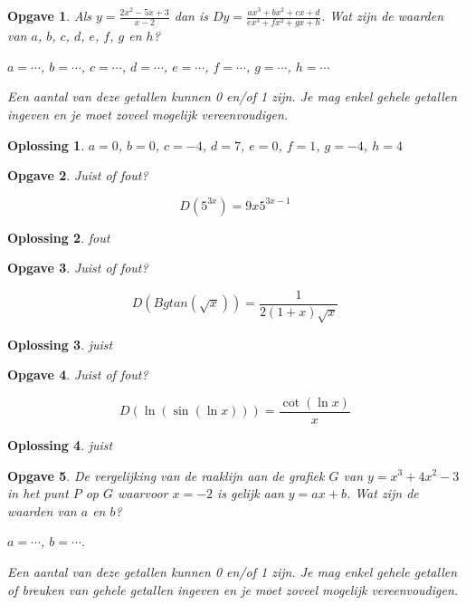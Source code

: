 \documentclass{article}
\newtheorem{opgave}{Opgave}
\newtheorem*{oplossing}{Oplossing}
\begin{document}
\begin{opgave}
Als $y=\frac{2x^2-5x+3}{x-2}$ dan is $Dy=\frac{ax^3+bx^2+cx+d}{ex^3+fx^2+gx+h}$. Wat zijn de waarden van $a$, $b$, $c$, $d$, $e$, $f$, $g$ en $h$?\vspace{2mm}

\noindent $a= \cdots$, $b=\cdots$, $c=\cdots$, $d=\cdots$, $e=\cdots$, $f=\cdots$, $g=\cdots$, $h=\cdots$ \vspace{1mm}

\noindent Een aantal van deze getallen kunnen 0 en/of 1 zijn. Je mag enkel gehele getallen ingeven en je moet zoveel mogelijk vereenvoudigen.
\end{opgave}

\begin{oplossing}
$a=0$, $b=0$, $c=-4$, $d=7$, $e=0$, $f=1$, $g=-4$, $h=4$
\end{oplossing}

\begin{opgave}
Juist of fout?

\[
D(5^{3x})=9x5^{3x-1}
\]
\end{opgave}

\begin{oplossing}
fout
\end{oplossing}

\begin{opgave}
Juist of fout?

\[
D(Bgtan(\sqrt{x}))=\frac{1}{2(1+x)\sqrt{x}}
\]
\end{opgave}

\begin{oplossing}
juist
\end{oplossing}

\begin{opgave}
Juist of fout?

\[
D(\ln (\sin (\ln x)))=\frac{\cot (\ln x)}{x}
\]
\end{opgave}

\begin{oplossing}
juist
\end{oplossing}

\begin{opgave}
De vergelijking van de raaklijn aan de grafiek $G$ van $y=x^3+4x^2-3$ in het punt $P$ op $G$ waarvoor $x=-2$ is gelijk aan $y=ax+b$.
Wat zijn de waarden van $a$ en $b$? \vspace{2mm}

\noindent $a=\cdots$, $b=\cdots$.\vspace{1mm}

\noindent Een aantal van deze getallen kunnen 0 en/of 1 zijn. Je mag enkel gehele getallen of breuken van gehele getallen ingeven en je moet zoveel mogelijk vereenvoudigen.
\end{opgave}
\end{document}
